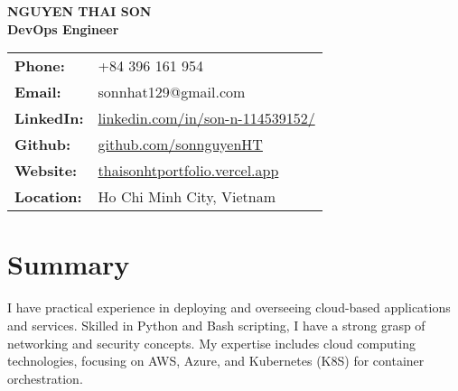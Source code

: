 \documentclass[a4paper,10pt]{article}
\begin{document}
\begin{center}
    {\Huge \textbf{NGUYEN THAI SON}} \\
    \vspace{6pt}
    \textbf{DevOps Engineer} \\
    \vspace{6pt}
    \begin{tabular}{ll}
        \textbf{Phone:} & +84 396 161 954 \\
        \textbf{Email:} & sonnhat129@gmail.com \\
        \textbf{LinkedIn:} & \href{https://www.linkedin.com/in/son-n-114539152/}{linkedin.com/in/son-n-114539152/} \\
        \textbf{Github:} & \href{https://github.com/sonnguyenHT}{github.com/sonnguyenHT} \\
        \textbf{Website:} & \href{https://thaisonhtportfolio.vercel.app/}{thaisonhtportfolio.vercel.app} \\
        \textbf{Location:} & Ho Chi Minh City, Vietnam \\
    \end{tabular}
\end{center}

\vspace{10pt}
\section*{Summary}
I have practical experience in deploying and overseeing cloud-based applications and services. Skilled in Python and Bash scripting, I have a strong grasp of networking and security concepts. My expertise includes cloud computing technologies, focusing on AWS, Azure, and Kubernetes (K8S) for container orchestration.

\vspace{5pt}
\end{document}
